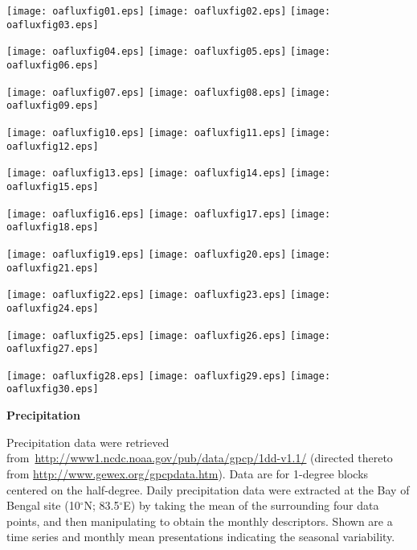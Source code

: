 \documentclass[letterpaper,12pt,oneside]{article}
\newcommand{\degree}{\ensuremath{^\circ}}
\newcommand{\SPURS}{Bay of Bengal}
\newcommand{\SitePos}{10\degree{N}; 83.5\degree{E}}
\begin{document}
\texttt{[image: oafluxfig01.eps]}
\texttt{[image: oafluxfig02.eps]}
\texttt{[image: oafluxfig03.eps]}

\texttt{[image: oafluxfig04.eps]}
\texttt{[image: oafluxfig05.eps]}
\texttt{[image: oafluxfig06.eps]}

\texttt{[image: oafluxfig07.eps]}
\texttt{[image: oafluxfig08.eps]}
\texttt{[image: oafluxfig09.eps]}

\texttt{[image: oafluxfig10.eps]}
\texttt{[image: oafluxfig11.eps]}
\texttt{[image: oafluxfig12.eps]}

\texttt{[image: oafluxfig13.eps]}
\texttt{[image: oafluxfig14.eps]}
\texttt{[image: oafluxfig15.eps]}

\texttt{[image: oafluxfig16.eps]}
\texttt{[image: oafluxfig17.eps]}
\texttt{[image: oafluxfig18.eps]}

\texttt{[image: oafluxfig19.eps]}
\texttt{[image: oafluxfig20.eps]}
\texttt{[image: oafluxfig21.eps]}

\texttt{[image: oafluxfig22.eps]}
\texttt{[image: oafluxfig23.eps]}
\texttt{[image: oafluxfig24.eps]}

\texttt{[image: oafluxfig25.eps]}
\texttt{[image: oafluxfig26.eps]}
\texttt{[image: oafluxfig27.eps]}

\texttt{[image: oafluxfig28.eps]}
\texttt{[image: oafluxfig29.eps]}
\texttt{[image: oafluxfig30.eps]}


% 

\clearpage

\begin{center}
\large\textbf{Precipitation}
\end{center}

Precipitation data were retrieved from\
\url{http://www1.ncdc.noaa.gov/pub/data/gpcp/1dd-v1.1/} (directed thereto
from \url{http://www.gewex.org/gpcpdata.htm}).  Data are for 1-degree
blocks centered on the half-degree.  Daily precipitation data were
extracted at the {\SPURS} site (\SitePos) by taking the mean of the
surrounding four data points, and then manipulating to obtain the monthly
descriptors. Shown are a time series and monthly mean presentations
indicating the seasonal variability.
\end{document}
